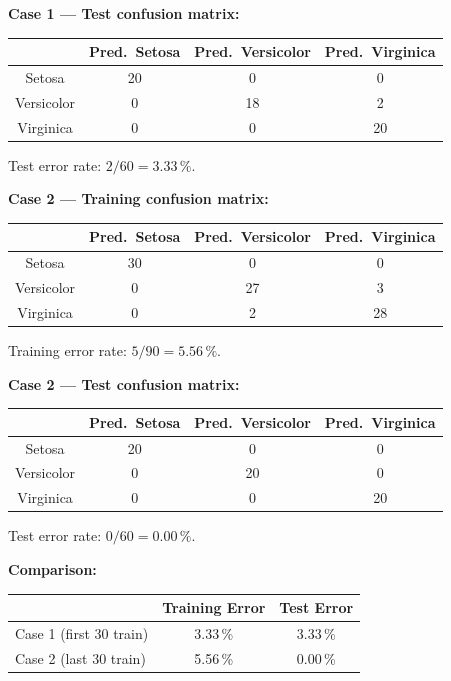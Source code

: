 \documentclass[11pt,a4paper]{article}
\begin{document}
\bigskip
\noindent\textbf{Case 1 --- Test confusion matrix:}
\begin{center}
\begin{tabular}{c|ccc}
\toprule
 & Pred.\ Setosa & Pred.\ Versicolor & Pred.\ Virginica \\
\midrule
Setosa     & 20 & 0  & 0  \\
Versicolor & 0  & 18 & 2  \\
Virginica  & 0  & 0  & 20 \\
\bottomrule
\end{tabular}
\end{center}
Test error rate: $2/60 = 3.33\,\%$.

\bigskip
\noindent\textbf{Case 2 --- Training confusion matrix:}
\begin{center}
\begin{tabular}{c|ccc}
\toprule
 & Pred.\ Setosa & Pred.\ Versicolor & Pred.\ Virginica \\
\midrule
Setosa     & 30 & 0  & 0  \\
Versicolor & 0  & 27 & 3  \\
Virginica  & 0  & 2  & 28 \\
\bottomrule
\end{tabular}
\end{center}
Training error rate: $5/90 = 5.56\,\%$.

\bigskip
\noindent\textbf{Case 2 --- Test confusion matrix:}
\begin{center}
\begin{tabular}{c|ccc}
\toprule
 & Pred.\ Setosa & Pred.\ Versicolor & Pred.\ Virginica \\
\midrule
Setosa     & 20 & 0  & 0  \\
Versicolor & 0  & 20 & 0  \\
Virginica  & 0  & 0  & 20 \\
\bottomrule
\end{tabular}
\end{center}
Test error rate: $0/60 = 0.00\,\%$.

\bigskip
\noindent\textbf{Comparison:}
\begin{center}
\begin{tabular}{lcc}
\toprule
 & Training Error & Test Error \\
\midrule
Case 1 (first 30 train) & 3.33\,\% & 3.33\,\% \\
Case 2 (last 30 train)  & 5.56\,\% & 0.00\,\% \\
\bottomrule
\end{tabular}
\end{center}
\end{document}
